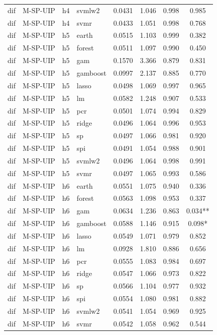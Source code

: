 \begin{ThreePartTable}
\begin{longtable}[t]{llclcccc}
dif & M-SP-UIP & h4 & svmlw2 & 0.0431 & 1.046 & 0.998 & 0.985\\
dif & M-SP-UIP & h4 & svmr & 0.0433 & 1.051 & 0.998 & 0.768\\
\addlinespace
dif & M-SP-UIP & h5 & earth & 0.0515 & 1.103 & 0.999 & 0.382\\
dif & M-SP-UIP & h5 & forest & 0.0511 & 1.097 & 0.990 & 0.450\\
dif & M-SP-UIP & h5 & gam & 0.1570 & 3.366 & 0.879 & 0.831\\
dif & M-SP-UIP & h5 & gamboost & 0.0997 & 2.137 & 0.885 & 0.770\\
dif & M-SP-UIP & h5 & lasso & 0.0498 & 1.069 & 0.997 & 0.965\\
dif & M-SP-UIP & h5 & lm & 0.0582 & 1.248 & 0.907 & 0.533\\
dif & M-SP-UIP & h5 & pcr & 0.0501 & 1.074 & 0.994 & 0.829\\
dif & M-SP-UIP & h5 & ridge & 0.0496 & 1.064 & 0.996 & 0.953\\
dif & M-SP-UIP & h5 & sp & 0.0497 & 1.066 & 0.981 & 0.920\\
dif & M-SP-UIP & h5 & spi & 0.0491 & 1.054 & 0.988 & 0.901\\
dif & M-SP-UIP & h5 & svmlw2 & 0.0496 & 1.064 & 0.998 & 0.991\\
dif & M-SP-UIP & h5 & svmr & 0.0497 & 1.065 & 0.993 & 0.586\\
\addlinespace
dif & M-SP-UIP & h6 & earth & 0.0551 & 1.075 & 0.940 & 0.336\\
dif & M-SP-UIP & h6 & forest & 0.0563 & 1.098 & 0.953 & 0.337\\
dif & M-SP-UIP & h6 & gam & 0.0634 & 1.236 & 0.863 & 0.034**\\
dif & M-SP-UIP & h6 & gamboost & 0.0588 & 1.146 & 0.915 & 0.098*\\
dif & M-SP-UIP & h6 & lasso & 0.0549 & 1.071 & 0.979 & 0.852\\
dif & M-SP-UIP & h6 & lm & 0.0928 & 1.810 & 0.886 & 0.656\\
dif & M-SP-UIP & h6 & pcr & 0.0555 & 1.083 & 0.984 & 0.697\\
dif & M-SP-UIP & h6 & ridge & 0.0547 & 1.066 & 0.973 & 0.822\\
dif & M-SP-UIP & h6 & sp & 0.0566 & 1.104 & 0.977 & 0.932\\
dif & M-SP-UIP & h6 & spi & 0.0554 & 1.080 & 0.981 & 0.882\\
dif & M-SP-UIP & h6 & svmlw2 & 0.0541 & 1.054 & 0.969 & 0.925\\
dif & M-SP-UIP & h6 & svmr & 0.0542 & 1.058 & 0.962 & 0.544\\

\end{longtable}
\end{ThreePartTable}
